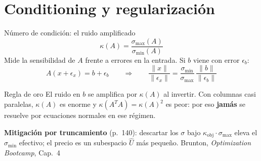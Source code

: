 \documentclass[10pt,aspectratio=169]{beamer}
\newcommand{\fuente}{\vfill{\scriptsize\color{gray}Brunton, \emph{Optimization Bootcamp}, Cap.~4}}
\begin{document}
\section{Conditioning y regularización}

\begin{frame}{Número de condición: el ruido amplificado}
  \small
  \[
    \kappa(A) = \frac{\sigma_{\max}(A)}{\sigma_{\min}(A)} \tag{4.34}
  \]
  Mide la sensibilidad de $A$ frente a errores en la entrada. Si $b$ viene con
  error $\epsilon_b$:
  \[
    A(x+\epsilon_x) = b + \epsilon_b
    \qquad\Longrightarrow\qquad
    \frac{\|x\|}{\|\epsilon_x\|}
    = \frac{\sigma_{\min}}{\sigma_{\max}}\,
      \frac{\|b\|}{\|\epsilon_b\|}
  \]

  \begin{alertblock}{Regla de oro}
    El ruido en $b$ se amplifica por $\kappa(A)$ al invertir. Con columnas casi
    paralelas, $\kappa(A)$ es enorme y $\kappa(A^TA)=\kappa(A)^2$ es peor:
    por eso \textbf{jamás} se resuelve por ecuaciones normales en ese régimen.
  \end{alertblock}

  \vspace{1mm}
  \small
  \textbf{Mitigación por truncamiento} (p.~140): descartar los $\sigma$ bajo
  $\kappa_{\text{obj}}\cdot\sigma_{\max}$ eleva el $\sigma_{\min}$ efectivo;
  el precio es un subespacio $\hat{U}$ más pequeño.
  \fuente
\end{frame}
\end{document}
